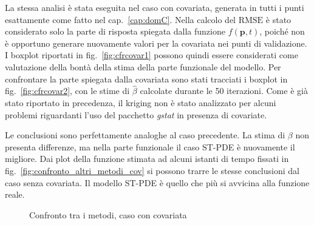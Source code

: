 \documentclass[a4paper,11pt,twoside,openright]{book}							%
\begin{document}
La stessa analisi è stata eseguita nel caso con covariata, generata in tutti i punti esattamente come fatto nel cap.~\ref{cap:domC}. Nella calcolo del $\mathrm{RMSE}$ è stato considerato solo la parte di risposta spiegata dalla funzione $f(\bm p,t)$, poiché non è opportuno generare nuovamente valori per la covariata nei punti di validazione. I boxplot riportati in fig.~\ref{fig:cfrcovar1} possono quindi essere considerati come valutazione della bontà della stima della parte funzionale del modello. Per confrontare la parte spiegata dalla covariata sono stati tracciati i boxplot in fig.~\ref{fig:cfrcovar2}, con le stime di $\hat{\beta}$ calcolate durante le 50 iterazioni. Come è già stato riportato in precedenza, il kriging non è stato analizzato per alcuni problemi riguardanti l'uso del pacchetto \textit{gstat} in presenza di covariate.

Le conclusioni sono perfettamente analoghe al caso precedente. La stima di $\beta$ non presenta differenze, ma nella parte funzionale il caso ST-PDE è nuovamente il migliore. Dai plot della funzione stimata ad alcuni istanti di tempo fissati in fig.~\ref{fig:confronto_altri_metodi_cov} si possono trarre le stesse conclusioni dal caso senza covariata. Il modello ST-PDE è quello che più si avvicina alla funzione reale.

\begin{figure}[t]
	\centering
	\caption{Confronto tra i metodi, caso con covariata}
	\label{fig:cfrcovar}
\end{figure}
\end{document}
